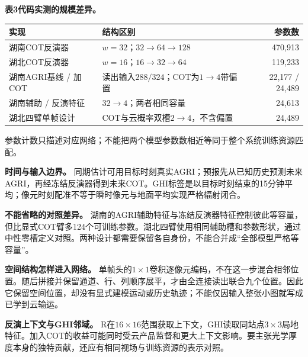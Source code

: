 \documentclass[UTF8,a4paper,10pt,fontset=none]{ctexart}
\begin{document}
\clearpage{}\par\vspace{4mm}
\textbf{表3\quad 代码实测的规模差异。}\par
\begin{tabularx}{\linewidth}{p{46mm}Yr}\toprule
实现 & 结构区别 & 参数数\\\midrule
湖南COT反演器 & $w=32$；$32\to64\to128$ & 470,913\\
湖北COT反演器 & $w=16$；$16\to32\to64$ & 119,233\\
湖南AGRI基线 / 加COT & 读出输入$288/324$；COT为$1\to4$带偏置 & 22,177 / 24,489\\
湖南辅助 / 反演特征 & $32\to4$；两者相同容量 & 24,613\\
湖北四臂单帧设计 & COT与云概率双槽$2\to4$，不含偏置 & 24,489\\\bottomrule\end{tabularx}
{\small\color{muted}参数计数只描述对应网络；不能把两个模型参数数相近等同于整个系统训练资源匹配。\par}
\textbf{时间与输入边界。} 同期估计可用目标时刻真实AGRI；预报先从已知历史预测未来AGRI，再经冻结反演器得到未来COT。GHI标签是以目标时刻结束的15分钟平均；像元时刻配准不等于瞬时像元与地面平均实现严格辐射闭合。

\textbf{不能省略的对照差异。} 湖南的AGRI辅助特征与冻结反演器特征控制彼此等容量，但比显式COT臂多124个可训练参数。湖北四臂使用相同辅助槽和参数形状，通过中性零槽定义对照。两种设计都需要保留各自身份，不能合并成“全部模型严格等容量”。

\textbf{空间结构怎样进入网络。} 单帧头的$1\times1$卷积逐像元编码，不在这一步混合相邻位置。随后拼接并保留通道、行、列顺序展平，才由全连接读出联合九个位置。因此它保留空间位置，却没有显式建模运动或历史轨迹；不能仅因输入整张小图就写成已学到云输运。

\textbf{反演上下文与GHI邻域。} R在$16\times16$范围获取上下文，GHI读取同站点$3\times3$局地特征。加入COT的收益可能同时受云产品监督和更大上下文影响。要主张光学厚度本身的独特贡献，还应有相同视场与训练资源的表示对照。
\end{document}
